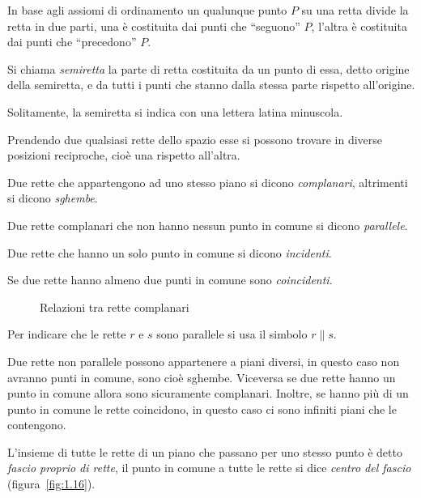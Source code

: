 In base agli assiomi di ordinamento un qualunque punto $P$ su una retta divide la retta in due parti, una è costituita dai punti che ``seguono'' $P$, l'altra è costituita dai punti che ``precedono'' $P$.
\begin{definizione}
Si chiama \emph{semiretta} la parte di retta costituita da un punto di essa, detto origine della semiretta, e da tutti i punti che stanno dalla stessa parte rispetto all'origine.
\end{definizione}
Solitamente, la semiretta si indica con una lettera latina minuscola.

Prendendo due qualsiasi rette dello spazio esse si possono trovare in diverse posizioni reciproche, cioè una rispetto all'altra.
\begin{definizione}
Due rette che appartengono ad uno stesso piano si dicono \emph{complanari}, altrimenti si dicono \emph{sghembe}.
\end{definizione}

\begin{definizione}
Due rette complanari che non hanno nessun punto in comune si dicono \emph{parallele}.
\end{definizione}

\begin{definizione}
Due rette che hanno un solo punto in comune si dicono \emph{incidenti}.
\end{definizione}

\begin{definizione}
Se due rette hanno almeno due punti in comune sono \emph{coincidenti}.
\end{definizione}

\begin{figure}[hbt]
 \centering 
 \caption{Relazioni tra rette complanari}\label{fig:1.12}
\end{figure}
Per indicare che le rette $r$ e $s$ sono parallele si usa il simbolo $r \parallel s$.

\osservazione Due rette non parallele possono appartenere a piani diversi, in questo caso non avranno punti in comune, sono cioè sghembe. Viceversa se due rette hanno un punto in comune allora sono sicuramente complanari. Inoltre, se hanno più di un punto in comune le rette coincidono, in questo caso ci sono infiniti piani che le contengono. 

\begin{definizione}
L'insieme di tutte le rette di un piano che passano per uno stesso punto è detto \emph{fascio proprio di rette}, il punto in comune a tutte le rette si dice \emph{centro del fascio} (figura~\ref{fig:1.16}).
\end{definizione}

